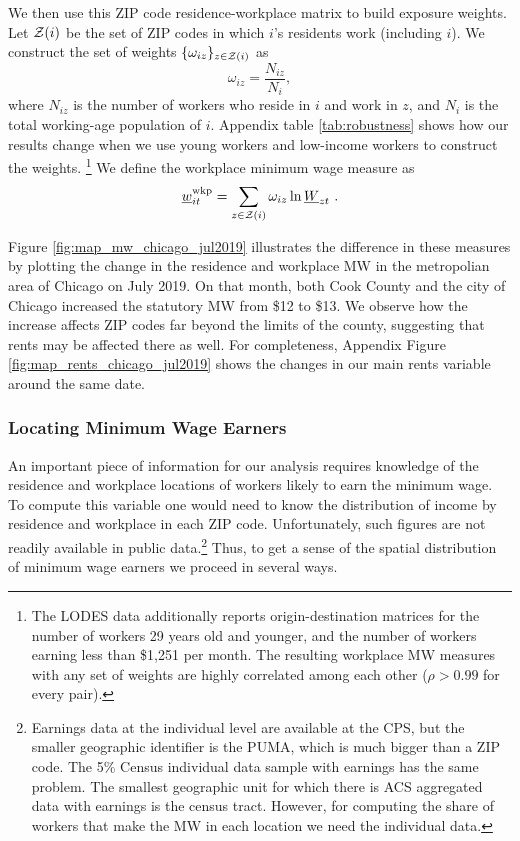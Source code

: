 We then use this ZIP code residence-workplace matrix to build exposure weights.
Let $\mathcal{Z}(i)$ be the set of ZIP codes in which $i$'s residents work 
(including $i$).
We construct the set of weights $\{\omega_{iz}\}_{z\in\mathcal{Z}(i)}$ as 
$$
\omega_{iz} = \frac{N_{iz}}{N_i} ,
$$
where 
$N_{iz}$ is the number of workers who reside in $i$ and work in $z$, 
and $N_i$ is the total working-age population of $i$.
Appendix table \ref{tab:robustness} shows how our results change when we 
use young workers and low-income workers to construct the weights.%
\footnote{The LODES data additionally reports origin-destination matrices for 
the number of workers 29 years old and younger, and the number of workers 
earning less than \$1,251 per month.
The resulting workplace MW measures with any set of weights are highly correlated 
among each other ($\rho>0.99$ for every pair).}
We define the workplace minimum wage measure as
\begin{equation}
    \underline{w}^{\text{wkp}}_{it} = \sum_{z\in\mathcal{Z}(i)} \omega_{iz} \ln \underline{W}_{zt} \ .
\end{equation}

Figure \ref{fig:map_mw_chicago_jul2019} illustrates the difference in these 
measures by plotting the change in the residence and workplace MW 
in the metropolian area of Chicago on July 2019.
On that month, both Cook County and the city of Chicago increased the statutory 
MW from \$12 to \$13.
We observe how the increase affects ZIP codes far beyond the limits of the 
county, suggesting that rents may be affected there as well.
For completeness, Appendix Figure \ref{fig:map_rents_chicago_jul2019} shows
the changes in our main rents variable around the same date.

\subsubsection*{Locating Minimum Wage Earners}

An important piece of information for our analysis requires knowledge of the
residence and workplace locations of workers likely to earn the minimum wage.
To compute this variable one would need to know the distribution of income
by residence and workplace in each ZIP code.
Unfortunately, such figures are not readily available in public data.\footnote{
Earnings data at the individual level are available at the CPS, but the smaller geographic
identifier is the PUMA, which is much bigger than a ZIP code. The 5\% Census individual data 
sample with earnings has the same problem. The smallest geographic unit for which there is  
ACS aggregated data with earnings is the census tract. However, for computing the share of 
workers that make the MW in each location we need the individual data.}
Thus, to get a sense of the spatial distribution of minimum wage earners we proceed in several ways.

